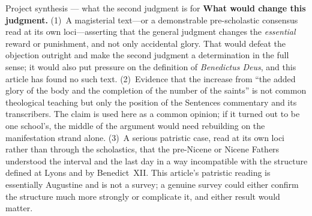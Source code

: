 \begin{studybox}{Project synthesis --- what the second judgment is for}
\textbf{What would change this judgment.} (1)~A magisterial text---or a demonstrable pre-scholastic consensus read at its own loci---asserting that the general judgment changes the \emph{essential} reward or punishment, and not only accidental glory. That would defeat the objection outright and make the second judgment a determination in the full sense; it would also put pressure on the definition of \emph{Benedictus Deus}, and this article has found no such text. (2)~Evidence that the increase from ``the added glory of the body and the completion of the number of the saints'' is not common theological teaching but only the position of the Sentences commentary and its transcribers. The claim is used here as a common opinion; if it turned out to be one school's, the middle of the argument would need rebuilding on the manifestation strand alone. (3)~A serious patristic case, read at its own loci rather than through the scholastics, that the pre-Nicene or Nicene Fathers understood the interval and the last day in a way incompatible with the structure defined at Lyons and by Benedict~XII. This article's patristic reading is essentially Augustine and is not a survey; a genuine survey could either confirm the structure much more strongly or complicate it, and either result would matter.
\end{studybox}
